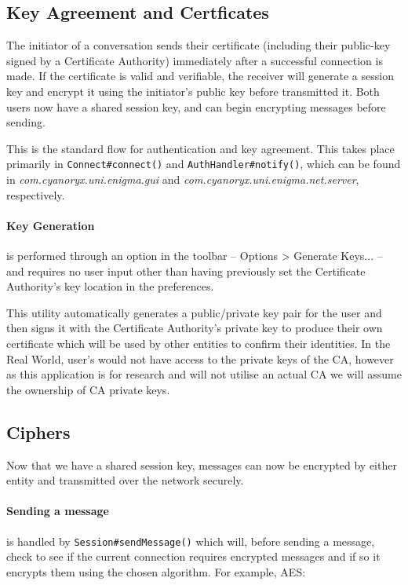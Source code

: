   \subsection{Key Agreement and Certficates}
  
  The initiator of a conversation sends their certificate (including their public-key signed by a Certificate Authority) immediately after a successful connection is made. If the certificate is valid and verifiable, the receiver will generate a session key and encrypt it using the initiator's public key before transmitted it. Both users now have a shared session key, and can begin encrypting messages before sending.
  
  This is the standard flow for authentication and key agreement. This takes place primarily in \verb!Connect#connect()! and \verb!AuthHandler#notify()!, which can be found in \emph{com.cyanoryx.uni.enigma.gui} and \emph{com.cyanoryx.uni.enigma.net.server}, respectively.
  
  \paragraph{Key Generation} is performed through an option in the toolbar -- Options > Generate Keys... -- and requires no user input other than having previously set the Certificate Authority's key location in the preferences.
    
  This utility automatically generates a public/private key pair for the user and then signs it with the Certificate Authority's private key to produce their own certificate which will be used by other entities to confirm their identities. In the Real World, user's would not have access to the private keys of the CA, however as this application is for research and will not utilise an actual CA we will assume the ownership of CA private keys.
  
  \subsection{Ciphers}
  
  Now that we have a shared session key, messages can now be encrypted by either entity and transmitted over the network securely. 
  
  \paragraph{Sending a message} is handled by \verb!Session#sendMessage()! which will, before sending a message, check to see if the current connection requires encrypted messages and if so it encrypts them using the chosen algorithm. For example, AES: \\
  

